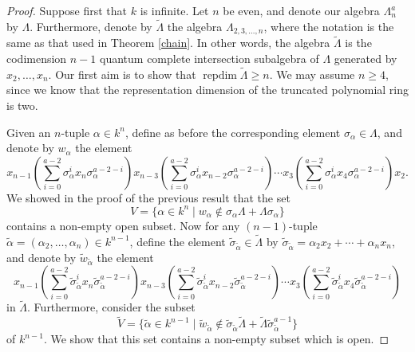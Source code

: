 \documentclass[a4paper]{amsart}
\theoremstyle{definition}
\theoremstyle{definition}
\theoremstyle{definition}
\theoremstyle{definition}
\theoremstyle{definition}
\theoremstyle{definition}
\theoremstyle{remark}
\theoremstyle{remark}
\theoremstyle{definition}
\theoremstyle{definition}
\begin{document}
\begin{proof}
Suppose first that $k$ is infinite. Let $n$ be even, and denote our
algebra $\Lambda_n^a$ by $\Lambda$. Furthermore, denote by
$\tilde{\Lambda}$ the algebra $\Lambda_{2,3,\dots,n}$, where the
notation is the same as that used in Theorem \ref{chain}. In other
words, the algebra $\tilde{\Lambda}$ is the codimension $n-1$
quantum complete intersection subalgebra of $\Lambda$ generated by
$x_2, \dots, x_n$. Our first aim is to show that ${\operatorname{repdim}\nolimits}
\tilde{\Lambda} \ge n$. We may assume $n \ge 4$, since we know that
the representation dimension of the truncated polynomial ring is
two.

Given an $n$-tuple $\alpha \in k^n$, define as before the
corresponding element $\sigma_{\alpha} \in \Lambda$, and denote by
$w_{\alpha}$ the element
$$x_{n-1} \left ( \sum_{i=0}^{a-2} \sigma_{\alpha}^i x_n \sigma_{\alpha}^{a-2-i}
\right ) x_{n-3} \left ( \sum_{i=0}^{a-2} \sigma_{\alpha}^i x_{n-2}
\sigma_{\alpha}^{a-2-i} \right ) \cdots x_3 \left ( \sum_{i=0}^{a-2}
\sigma_{\alpha}^i x_4 \sigma_{\alpha}^{a-2-i} \right ) x_2.$$ We
showed in the proof of the previous result that the set
$$V = \{ \alpha \in k^n \mid w_{\alpha} \notin
\sigma_{\alpha} \Lambda + \Lambda \sigma_{\alpha} \}$$ contains a
non-empty open subset. Now for any $(n-1)$-tuple $\tilde{\alpha} =(
\alpha_2, \dots, \alpha_n ) \in k^{n-1}$, define the element
$\tilde{\sigma}_{\tilde{\alpha}} \in \tilde{\Lambda}$ by
$\tilde{\sigma}_{\tilde{\alpha}} = \alpha_2x_2 + \cdots +
\alpha_nx_n$, and denote by $\tilde{w}_{\tilde{\alpha}}$ the element
$$x_{n-1} \left ( \sum_{i=0}^{a-2} \tilde{\sigma}_{\tilde{\alpha}}^i x_n
\tilde{\sigma}_{\tilde{\alpha}}^{a-2-i}
\right ) x_{n-3} \left ( \sum_{i=0}^{a-2}
\tilde{\sigma}_{\tilde{\alpha}}^i x_{n-2}
\tilde{\sigma}_{\tilde{\alpha}}^{a-2-i} \right ) \cdots x_3 \left (
\sum_{i=0}^{a-2} \tilde{\sigma}_{\tilde{\alpha}}^i x_4
\tilde{\sigma}_{\tilde{\alpha}}^{a-2-i} \right ) $$ in
$\tilde{\Lambda}$. Furthermore, consider the subset
$$\tilde{V} = \{ \tilde{\alpha} \in k^{n-1} \mid
\tilde{w}_{\tilde{\alpha}} \notin \tilde{\sigma}_{\tilde{\alpha}}
\tilde{\Lambda} + \tilde{\Lambda}
\tilde{\sigma}_{\tilde{\alpha}}^{a-1} \}$$ of $k^{n-1}$. We show
that this set contains a non-empty subset which is open.


\end{proof}
\end{document}
